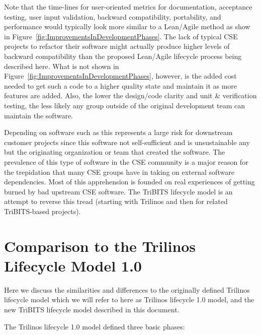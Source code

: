 \documentclass[11pt]{SANDreport}
\begin{document}
Note that the time-lines for user-oriented metrics for documentation,
acceptance testing, user input validation, backward compatibility,
portability, and performance would typically look more similar to a
Lean/Agile method as show in
Figure~\ref{fig:ImprovementsInDevelopmentPhases}.  The lack of typical
CSE projects to refactor their software might actually produce higher
levels of backward compatibility than the proposed Lean/Agile
lifecycle process being described here.  What is not shown in
Figure~\ref{fig:ImprovementsInDevelopmentPhases}, however, is the
added cost needed to get such a code to a higher quality state and
maintain it as more features are added.  Also, the lower the
design/code clarity and unit \& verification testing, the less likely
any group outside of the original development team can maintain the
software.

Depending on software such as this represents a large risk for
downstream customer projects since this software not self-sufficient
and is unsustainable any but the originating organization or team that
created the software.  The prevalence of this type of software in the
CSE community is a major reason for the trepidation that many CSE
groups have in taking on external software dependencies.  Most of this
apprehension is founded on real experiences of getting burned by bad
upstream CSE software.  The TriBITS lifecycle model is an attempt to
reverse this tread (starting with Trilinos and then for related
TriBITS-based projects).


%
\section{Comparison to the Trilinos Lifecycle Model 1.0}
\label{sec:compare_with_lifecycle_1.0_model}
%

Here we discuss the similarities and differences to the originally
defined Trilinos lifecycle model {}\cite{TrilinosLifecycleModel2007}
which we will refer to here as Trilinos lifecycle 1.0 model, and the
new TriBITS lifecycle model described in this document.

The Trilinos lifecycle 1.0 model defined three basic phases:
\end{document}
